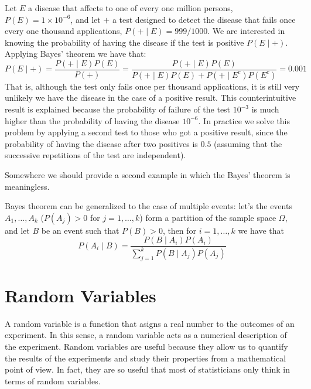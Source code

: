 \begin{example}
Let $E$ a disease that affects to one of every one million persons, $P(E) = 1 \times 10^{-6}$, and let $+$ a test designed to detect the disease that fails once every one thousand applications, $P(+ \mid E) = 999/1000$. We are interested in knowing the probability of having the disease if the test is positive $P(E \mid +)$. Applying Bayes' theorem we have that:
\[
P(E \mid +) = \frac{P(+ \mid E) P(E)}{P(+)} = \frac{P(+ \mid E) P(E)}{P(+ \mid E) P(E) + P(+ \mid E^c) P(E^c)} = 0.001
\]
That is, although the test only fails once per thousand applications, it is still very unlikely we have the disease in the case of a positive result. This counterintuitive result is explained because the probability of failure of the test $10^{-3}$ is much higher than the probability of having the disease $10^{-6}$. In practice we solve this problem by applying a second test to those who got a positive result, since the probability of having the disease after two positives is $0.5$ (assuming that the successive repetitions of the test are independent).
\end{example}

{\color{red} Somewhere we should provide a second example in which the Bayes' theorem is meaningless.}

Bayes theorem can be generalized to the case of multiple events: let's the events $A_{1}, \ldots, A_{k}$ ($P\left( A_{j} \right)>0$ for $j=1, \ldots, k$) form a partition of the sample space $\Omega$, and let $B$ be an event such that $P\left(B\right)>0$, then for $i=1, \ldots, k$ we have that
\[
P\left(A_{i}\mid B\right)=\frac{P\left(B\mid A_{i}\right) P\left(A_{i}\right)}{\sum_{j=1}^{k} P\left(B \mid A_{j}\right) P\left(A_{j}\right)}
\]

%
%

\section{Random Variables}
\label{sec:probability_random_variables}

A random variable is a function that asigns a real number to the outcomes of an experiment. In this sense, a random variable acts as a numerical description of the experiment. Random variables are useful because they allow us to quantify the results of the experiments and study their properties from a mathematical point of view. In fact, they are so useful that most of statisticians only think in terms of random variables.


